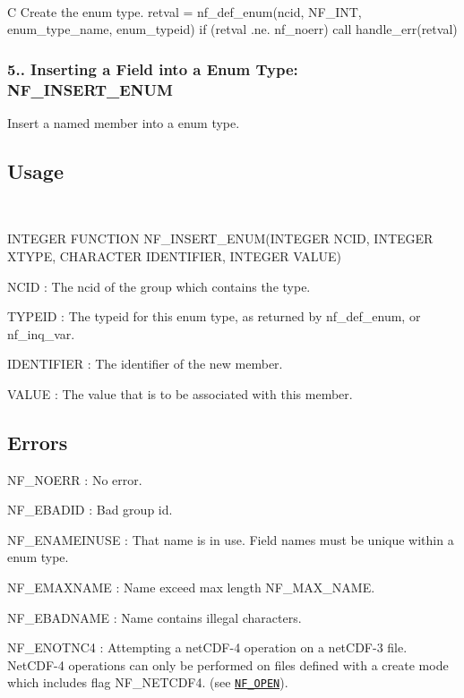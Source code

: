  

C Create the enum type. retval = nf\+\_\+def\+\_\+enum(ncid, N\+F\+\_\+\+I\+N\+T, enum\+\_\+type\+\_\+name, enum\+\_\+typeid) if (retval .ne. nf\+\_\+noerr) call handle\+\_\+err(retval)

\subsubsection*{5.. Inserting a Field into a Enum Type\+: N\+F\+\_\+\+I\+N\+S\+E\+R\+T\+\_\+\+E\+N\+UM}

Insert a named member into a enum type.

\subsection*{Usage }

 

I\+N\+T\+E\+G\+ER F\+U\+N\+C\+T\+I\+ON N\+F\+\_\+\+I\+N\+S\+E\+R\+T\+\_\+\+E\+N\+UM(I\+N\+T\+E\+G\+ER N\+C\+ID, I\+N\+T\+E\+G\+ER X\+T\+Y\+PE, C\+H\+A\+R\+A\+C\+T\+ER I\+D\+E\+N\+T\+I\+F\+I\+ER, I\+N\+T\+E\+G\+ER V\+A\+L\+UE)

{\ttfamily N\+C\+ID} \+: The ncid of the group which contains the type.

{\ttfamily T\+Y\+P\+E\+ID} \+: The typeid for this enum type, as returned by nf\+\_\+def\+\_\+enum, or nf\+\_\+inq\+\_\+var.

{\ttfamily I\+D\+E\+N\+T\+I\+F\+I\+ER} \+: The identifier of the new member.

{\ttfamily V\+A\+L\+UE} \+: The value that is to be associated with this member.

\subsection*{Errors }

{\ttfamily N\+F\+\_\+\+N\+O\+E\+RR} \+: No error.

{\ttfamily N\+F\+\_\+\+E\+B\+A\+D\+ID} \+: Bad group id.

{\ttfamily N\+F\+\_\+\+E\+N\+A\+M\+E\+I\+N\+U\+SE} \+: That name is in use. Field names must be unique within a enum type.

{\ttfamily N\+F\+\_\+\+E\+M\+A\+X\+N\+A\+ME} \+: Name exceed max length N\+F\+\_\+\+M\+A\+X\+\_\+\+N\+A\+ME.

{\ttfamily N\+F\+\_\+\+E\+B\+A\+D\+N\+A\+ME} \+: Name contains illegal characters.

{\ttfamily N\+F\+\_\+\+E\+N\+O\+T\+N\+C4} \+: Attempting a net\+C\+D\+F-\/4 operation on a net\+C\+D\+F-\/3 file. Net\+C\+D\+F-\/4 operations can only be performed on files defined with a create mode which includes flag N\+F\+\_\+\+N\+E\+T\+C\+D\+F4. (see \href{#NF_005fOPEN}{\tt N\+F\+\_\+\+O\+P\+EN}).

